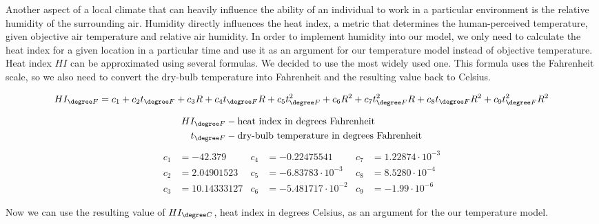 Another aspect of a local climate that can heavily influence the ability of an individual to work in a particular environment is the relative humidity of the surrounding air. Humidity directly influences the heat index, a metric that determines the human-perceived temperature, given objective air temperature and relative air humidity. In order to implement humidity into our model, we only need to calculate the heat index for a given location in a particular time and use it as an argument for our temperature model instead of objective temperature. Heat index $HI$ can be approximated using several formulas. We decided to use the most widely used one. This formula uses the Fahrenheit scale, so we also need to convert the dry-bulb temperature into Fahrenheit and the resulting value back to Celsius.

$$HI_{\degree F}= c_1+c_{2}t_{\degree F}+c_{3}R+c_{4}t_{\degree F}R+c_{5}t_{\degree F}^2+c_{6}R^2+c_{7}t_{\degree F}^{2}R+c_{8}t_{\degree F}R^2+c_{9}t_{\degree F}^{2}R^2$$



\begin{align*}
HI_{\degree F} &- \text{heat index in degrees Fahrenheit}\\
t_{\degree F} &- \text{dry-bulb temperature in degrees Fahrenheit}\\
\end{align*}
\begin{align*}
c_1 &= -42.379 & c_4 &= -0.22475541 & c_7 &= 1.22874 \cdot 10^{-3}\\
c_2 &= 2.04901523 & c_5 &= -6.83783 \cdot 10^{-3} & c_8 &= 8.5280 \cdot 10^{-4}\\
c_3 &= 10.14333127 & c_6 &= -5.481717 \cdot 10^{-2} & c_9 &= -1.99 \cdot 10^{-6}
\end{align*}

Now we can use the resulting value of $HI_{\degree C}$, heat index in degrees Celsius, as an argument for the our temperature model.
